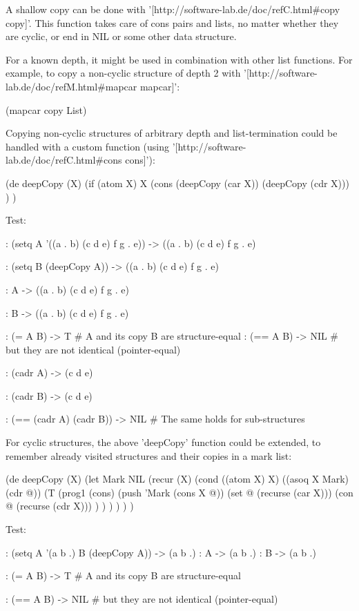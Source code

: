 \begin{wideverbatim}

A shallow copy can be done with '[http://software-lab.de/doc/refC.html#copy
copy]'. This function takes care of cons pairs and lists, no matter whether they
are cyclic, or end in NIL or some other data structure.

For a known depth, it might be used in combination with other list functions.
For example, to copy a non-cyclic structure of depth 2 with
'[http://software-lab.de/doc/refM.html#mapcar mapcar]':

(mapcar copy List)

Copying non-cyclic structures of arbitrary depth and list-termination could be
handled with a custom function (using
'[http://software-lab.de/doc/refC.html#cons cons]'):

(de deepCopy (X)
   (if (atom X)
      X
      (cons (deepCopy (car X)) (deepCopy (cdr X))) ) )

Test:

: (setq A '((a . b) (c d e) f g . e))
-> ((a . b) (c d e) f g . e)

: (setq B (deepCopy A))
-> ((a . b) (c d e) f g . e)

: A
-> ((a . b) (c d e) f g . e)

: B
-> ((a . b) (c d e) f g . e)

: (= A B)
-> T              # A and its copy B are structure-equal
: (== A B)
-> NIL            # but they are not identical (pointer-equal)

: (cadr A)
-> (c d e)

: (cadr B)
-> (c d e)

: (== (cadr A) (cadr B))
-> NIL            # The same holds for sub-structures

\end{wideverbatim}

\begin{wideverbatim}

For cyclic structures, the above 'deepCopy' function could be extended, to
remember already visited structures and their copies in a mark list:

(de deepCopy (X)
   (let Mark NIL
      (recur (X)
         (cond
            ((atom X) X)
            ((asoq X Mark) (cdr @))
            (T
               (prog1 (cons)
                  (push 'Mark (cons X @))
                  (set @ (recurse (car X)))
                  (con @ (recurse (cdr X))) ) ) ) ) ) )

Test:

: (setq A '(a b .)  B (deepCopy A))
-> (a b .)
: A
-> (a b .)
: B
-> (a b .)

: (= A B)
-> T              # A and its copy B are structure-equal

: (== A B)
-> NIL            # but they are not identical (pointer-equal)

\end{wideverbatim}

